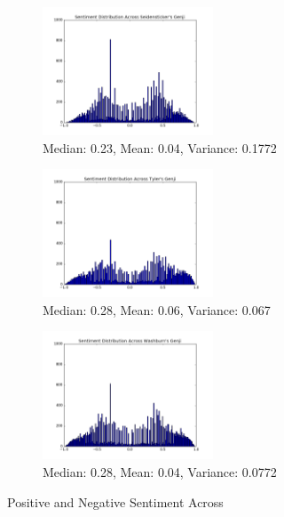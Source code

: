 \documentclass[12pt]{article}
\begin{document}
\begin{flushleft}
\begin{spacing}{2.0}
\begin{figure}
	\begin{subfigure}{.3\linewidth}
		\includegraphics[width=2in]{seidensticker-sentiment.png}\hfill
		\caption{\scriptsize Median: 0.23, Mean: 0.04, Variance: 0.1772}
	\end{subfigure}
	\begin{subfigure}{.3\linewidth}
		\includegraphics[width=2in]{tyler-sentiment.png}\hfill
		\caption{\scriptsize Median: 0.28, Mean: 0.06, Variance: 0.067}		
	\end{subfigure}
	\begin{subfigure}{.3\linewidth}
		\includegraphics[width=2in]{washburn-sentiment.png}
		\caption{\scriptsize Median: 0.28, Mean: 0.04, Variance: 0.0772}
	\end{subfigure}
    \caption{Positive and Negative Sentiment Across }
    \label{sentiment-hists}
\end{figure}


\end{spacing}
\end{flushleft}
\end{document}
